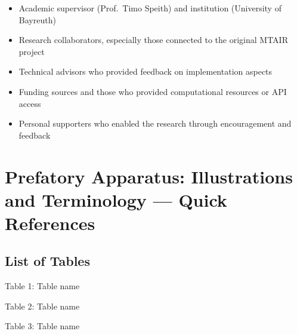 \documentclass[
  11pt,
  letterpaper,
]{book}
\providecommand{\tightlist}{%
  \setlength{\itemsep}{0pt}\setlength{\parskip}{0pt}}
\begin{document}
\begin{itemize}
\tightlist
\item
  Academic supervisor (Prof.~Timo Speith) and institution (University of
  Bayreuth)\\
\item
  Research collaborators, especially those connected to the original
  MTAIR project\\
\item
  Technical advisors who provided feedback on implementation aspects\\
\item
  Funding sources and those who provided computational resources or API
  access\\
\item
  Personal supporters who enabled the research through encouragement and
  feedback
\end{itemize}


\chapter*{Prefatory Apparatus: Illustrations and Terminology --- Quick
References}\label{prefatory-apparatus-illustrations-and-terminology-quick-references}


\section*{List of Tables}\label{list-of-tables}


Table 1: Table name

Table 2: Table name

Table 3: Table name
\end{document}
